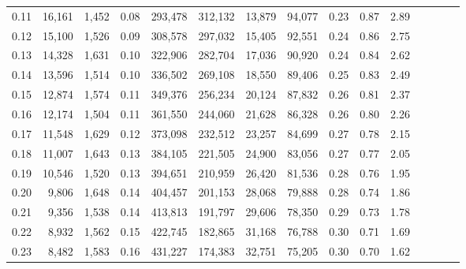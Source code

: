 \begin{tabular}{rrrcrrrrrrrrrrr}
0.11 &  16,161 &   1,452 &                                       0.08 &  293,478 &  312,132 &   13,879 &   94,077 &  0.23 &  0.87 &                         2.89 \\
0.12 &  15,100 &   1,526 &                                       0.09 &  308,578 &  297,032 &   15,405 &   92,551 &  0.24 &  0.86 &                         2.75 \\
0.13 &  14,328 &   1,631 &                                       0.10 &  322,906 &  282,704 &   17,036 &   90,920 &  0.24 &  0.84 &                         2.62 \\
0.14 &  13,596 &   1,514 &                                       0.10 &  336,502 &  269,108 &   18,550 &   89,406 &  0.25 &  0.83 &                         2.49 \\
0.15 &  12,874 &   1,574 &                                       0.11 &  349,376 &  256,234 &   20,124 &   87,832 &  0.26 &  0.81 &                         2.37 \\
0.16 &  12,174 &   1,504 &                                       0.11 &  361,550 &  244,060 &   21,628 &   86,328 &  0.26 &  0.80 &                         2.26 \\
0.17 &  11,548 &   1,629 &                                       0.12 &  373,098 &  232,512 &   23,257 &   84,699 &  0.27 &  0.78 &                         2.15 \\
0.18 &  11,007 &   1,643 &                                       0.13 &  384,105 &  221,505 &   24,900 &   83,056 &  0.27 &  0.77 &                         2.05 \\
0.19 &  10,546 &   1,520 &                                       0.13 &  394,651 &  210,959 &   26,420 &   81,536 &  0.28 &  0.76 &                         1.95 \\
0.20 &   9,806 &   1,648 &                                       0.14 &  404,457 &  201,153 &   28,068 &   79,888 &  0.28 &  0.74 &                         1.86 \\
0.21 &   9,356 &   1,538 &                                       0.14 &  413,813 &  191,797 &   29,606 &   78,350 &  0.29 &  0.73 &                         1.78 \\
0.22 &   8,932 &   1,562 &                                       0.15 &  422,745 &  182,865 &   31,168 &   76,788 &  0.30 &  0.71 &                         1.69 \\
0.23 &   8,482 &   1,583 &                                       0.16 &  431,227 &  174,383 &   32,751 &   75,205 &  0.30 &  0.70 &                         1.62 \\

\end{tabular}
